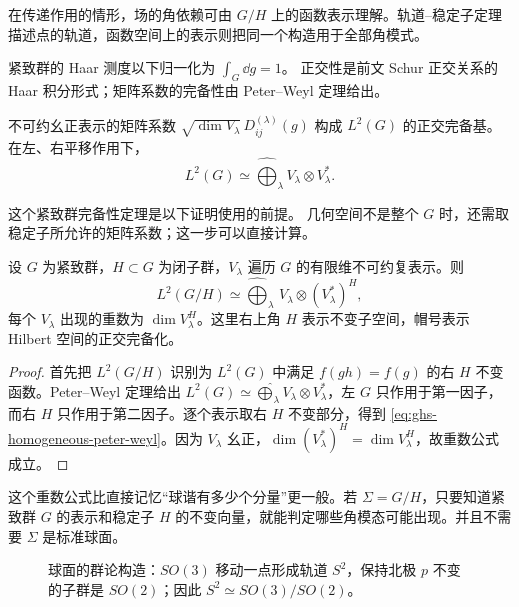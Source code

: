 在传递作用的情形，场的角依赖可由 $G/H$ 上的函数表示理解。轨道--稳定子定理描述点的轨道，函数空间上的表示则把同一个构造用于全部角模式。

紧致群的 Haar 测度以下归一化为 $\int_G\dd g=1$。
正交性是前文 Schur 正交关系的 Haar 积分形式；矩阵系数的完备性由 Peter--Weyl 定理给出。

\begin{theorem}
不可约幺正表示的矩阵系数
$\sqrt{\dim V_\lambda}\,D^{(\lambda)}_{ij}(g)$ 构成 $L^2(G)$ 的正交完备基。
在左、右平移作用下，
\[
 L^2(G)\simeq\widehat{\bigoplus}_\lambda V_\lambda\otimes V_\lambda^*.
\]
\end{theorem}

这个紧致群完备性定理是以下证明使用的前提。
几何空间不是整个 $G$ 时，还需取稳定子所允许的矩阵系数；这一步可以直接计算。

\begin{theorem}
\label{thm:ghs-peter-weyl-homogeneous}
设 $G$ 为紧致群，$H\subset G$ 为闭子群，$V_\lambda$ 遍历 $G$ 的有限维不可约复表示。则
\begin{equation}\label{eq:ghs-homogeneous-peter-weyl}
 L^2(G/H)\simeq\widehat{\bigoplus}_{\lambda}\,V_\lambda\otimes(V_\lambda^*)^H,
\end{equation}
每个 $V_\lambda$ 出现的重数为 $\dim V_\lambda^H$。这里右上角 $H$ 表示不变子空间，帽号表示 Hilbert 空间的正交完备化。
\end{theorem}
\begin{proof}
首先把 $L^2(G/H)$ 识别为 $L^2(G)$ 中满足 $f(gh)=f(g)$ 的右 $H$ 不变函数。Peter--Weyl 定理给出
$L^2(G)\simeq\widehat\bigoplus_\lambda V_\lambda\otimes V_\lambda^*$，左 $G$ 只作用于第一因子，而右 $H$ 只作用于第二因子。逐个表示取右 $H$ 不变部分，得到 \cref{eq:ghs-homogeneous-peter-weyl}。因为 $V_\lambda$ 幺正，$\dim(V_\lambda^*)^H=\dim V_\lambda^H$，故重数公式成立。
\end{proof}

这个重数公式比直接记忆“球谐有多少个分量”更一般。若 $\Sigma=G/H$，只要知道紧致群 $G$ 的表示和稳定子 $H$ 的不变向量，就能判定哪些角模态可能出现。并且不需要 $\Sigma$ 是标准球面。

\begin{figure}[htbp]
\centering

\caption{球面的群论构造：$SO(3)$ 移动一点形成轨道 $S^2$，保持北极 $p$ 不变的子群是 $SO(2)$；因此 $S^2\simeq SO(3)/SO(2)$。}\label{fig:ghs-group-orbit-stabilizer}
\end{figure}

